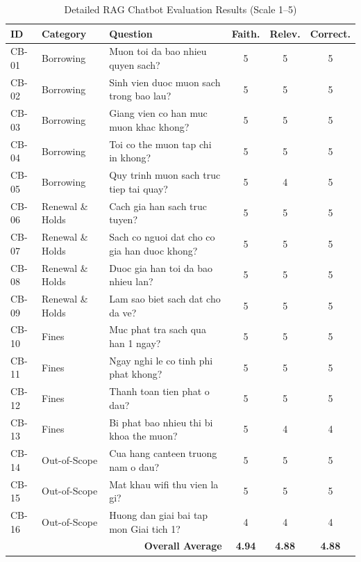 \begin{table}[H]
\centering
\caption{Detailed RAG Chatbot Evaluation Results (Scale 1--5)}
\label{tab:chatbot_eval_results}
\begin{tabularx}{\textwidth}{|l|p{3.2cm}|X|c|c|c|}
\hline
\textbf{ID} & \textbf{Category} & \textbf{Question} & \textbf{Faith.} & \textbf{Relev.} & \textbf{Correct.} \\
\hline
CB-01 & Borrowing & Muon toi da bao nhieu quyen sach? & 5 & 5 & 5 \\
\hline
CB-02 & Borrowing & Sinh vien duoc muon sach trong bao lau? & 5 & 5 & 5 \\
\hline
CB-03 & Borrowing & Giang vien co han muc muon khac khong? & 5 & 5 & 5 \\
\hline
CB-04 & Borrowing & Toi co the muon tap chi in khong? & 5 & 5 & 5 \\
\hline
CB-05 & Borrowing & Quy trinh muon sach truc tiep tai quay? & 5 & 4 & 5 \\
\hline
CB-06 & Renewal \& Holds & Cach gia han sach truc tuyen? & 5 & 5 & 5 \\
\hline
CB-07 & Renewal \& Holds & Sach co nguoi dat cho co gia han duoc khong? & 5 & 5 & 5 \\
\hline
CB-08 & Renewal \& Holds & Duoc gia han toi da bao nhieu lan? & 5 & 5 & 5 \\
\hline
CB-09 & Renewal \& Holds & Lam sao biet sach dat cho da ve? & 5 & 5 & 5 \\
\hline
CB-10 & Fines & Muc phat tra sach qua han 1 ngay? & 5 & 5 & 5 \\
\hline
CB-11 & Fines & Ngay nghi le co tinh phi phat khong? & 5 & 5 & 5 \\
\hline
CB-12 & Fines & Thanh toan tien phat o dau? & 5 & 5 & 5 \\
\hline
CB-13 & Fines & Bi phat bao nhieu thi bi khoa the muon? & 5 & 4 & 4 \\
\hline
CB-14 & Out-of-Scope & Cua hang canteen truong nam o dau? & 5 & 5 & 5 \\
\hline
CB-15 & Out-of-Scope & Mat khau wifi thu vien la gi? & 5 & 5 & 5 \\
\hline
CB-16 & Out-of-Scope & Huong dan giai bai tap mon Giai tich 1? & 4 & 4 & 4 \\
\hline
\multicolumn{3}{|r|}{\textbf{Overall Average}} & \textbf{4.94} & \textbf{4.88} & \textbf{4.88} \\
\hline
\end{tabularx}
\end{table}

